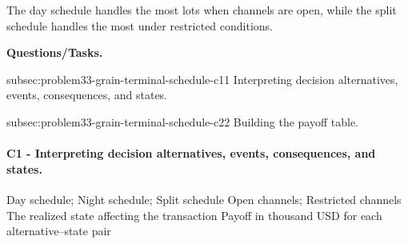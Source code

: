 	The day schedule handles the most lots when channels are open, while the split schedule handles the most under restricted conditions.

	\textbf{Questions/Tasks.}
	\begin{enumerate}
	\CriterionTask
	{subsec:problem33-grain-terminal-schedule-c1}{1}
	{Interpreting decision alternatives, events, consequences, and states.}

	\CriterionTask
	{subsec:problem33-grain-terminal-schedule-c2}{2}
	{Building the payoff table.}
	\end{enumerate}

\paragraph*{C1 - Interpreting decision alternatives, events, consequences, and states.}
	\label{subsec:problem33-grain-terminal-schedule-c1}
	\DecisionElementsTable
	{Day schedule; Night schedule; Split schedule}
	{Open channels; Restricted channels}
	{The realized state affecting the transaction}
	{Payoff in thousand USD for each alternative--state pair}

